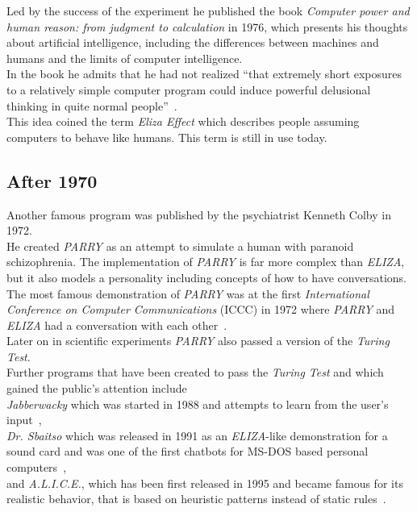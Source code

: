 Led by the success of the experiment he published the book \emph{Computer power and human reason: from judgment to calculation} in 1976,
which presents his thoughts about artificial intelligence,
including the differences between machines and humans and the limits of computer intelligence.
\\
In the book he admits that he had not realized ``that extremely short exposures to a relatively simple computer program could induce powerful delusional thinking in quite normal people''~\cite{bbcnowthen}.
\\
This idea coined the term \emph{Eliza Effect} which describes people assuming computers to behave like humans. This term is still in use today.


\subsection{After 1970}

Another famous program was published by the psychiatrist Kenneth Colby in 1972.
\\
He created \emph{PARRY} as an attempt to simulate a human with paranoid schizophrenia.
The implementation of \emph{PARRY} is far more complex than \emph{ELIZA},
but it also models a personality including concepts of how to have conversations.
\\
The most famous demonstration of \emph{PARRY} was at the first \emph{International Conference on Computer Communications} (ICCC) in 1972 where \emph{PARRY} and \emph{ELIZA} had a conversation with each other~\cite{internethistory}.
\\
Later on in scientific experiments \emph{PARRY} also passed a version of the \emph{Turing Test}.
\\

Further programs that have been created to pass the \emph{Turing Test} and which gained the public's attention include
\\
\emph{Jabberwacky} which was started in 1988 and attempts to learn from the user's input~\cite{jabberwacky},
\\
\emph{Dr. Sbaitso} which was released in 1991 as an \emph{ELIZA}-like demonstration for a sound card and was one of the first chatbots for MS-DOS based personal computers~\cite{pcmag},
\\
and \emph{A.L.I.C.E.}, which has been first released in 1995 and became famous for its realistic behavior, that is based on heuristic patterns instead of static rules~\cite{approximatinglife}.
\\

